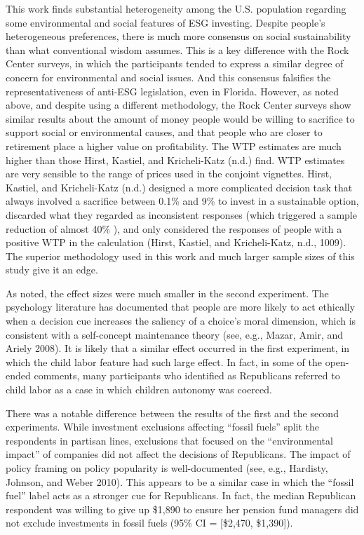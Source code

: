 \documentclass[
  12pt,
]{article}
\begin{document}
This work finds substantial heterogeneity among the U.S. population regarding some environmental and social features of ESG investing. Despite people's heterogeneous preferences, there is much more consensus on social sustainability than what conventional wisdom assumes. This is a key difference with the Rock Center surveys, in which the participants tended to express a similar degree of concern for environmental and social issues. And this consensus falsifies the representativeness of anti-ESG legislation, even in Florida. However, as noted above, and despite using a different methodology, the Rock Center surveys show similar results about the amount of money people would be willing to sacrifice to support social or environmental causes, and that people who are closer to retirement place a higher value on profitability. The WTP estimates are much higher than those Hirst, Kastiel, and Kricheli-Katz (n.d.) find. WTP estimates are very sensible to the range of prices used in the conjoint vignettes. Hirst, Kastiel, and Kricheli-Katz (n.d.) designed a more complicated decision task that always involved a sacrifice between 0.1\% and 9\% to invest in a sustainable option, discarded what they regarded as inconsistent responses (which triggered a sample reduction of almost 40\% ), and only considered the responses of people with a positive WTP in the calculation (Hirst, Kastiel, and Kricheli-Katz, n.d., 1009). The superior methodology used in this work and much larger sample sizes of this study give it an edge.

As noted, the effect sizes were much smaller in the second experiment. The psychology literature has documented that people are more likely to act ethically when a decision cue increases the saliency of a choice's moral dimension, which is consistent with a self-concept maintenance theory (see, e.g., Mazar, Amir, and Ariely 2008). It is likely that a similar effect occurred in the first experiment, in which the child labor feature had such large effect. In fact, in some of the open-ended comments, many participants who identified as Republicans referred to child labor as a case in which children autonomy was coerced.

There was a notable difference between the results of the first and the second experiments. While investment exclusions affecting ``fossil fuels'' split the respondents in partisan lines, exclusions that focused on the ``environmental impact'' of companies did not affect the decisions of Republicans. The impact of policy framing on policy popularity is well-documented (see, e.g., Hardisty, Johnson, and Weber 2010). This appears to be a similar case in which the ``fossil fuel'' label acts as a stronger cue for Republicans. In fact, the median Republican respondent was willing to give up \$1,890 to ensure her pension fund managers did not exclude investments in fossil fuels (95\% CI = {[}\$2,470, \$1,390{]}).
\end{document}
